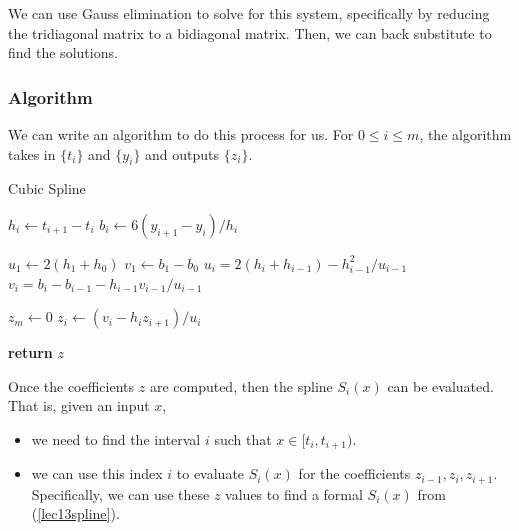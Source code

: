 \documentclass[letterpaper]{article}
\begin{document}
We can use Gauss elimination to solve for this system, specifically by reducing the tridiagonal matrix to a bidiagonal matrix. Then, we can back substitute to find the solutions. 

\subsubsection{Algorithm}
We can write an algorithm to do this process for us. For $0 \leq i \leq m$, the algorithm takes in $\{t_i\}$ and $\{y_i\}$ and outputs $\{z_i\}$. 
\begin{algorithm}[H]
    \caption{Cubic Spline}
    \begin{algorithmic}[1]
                \State $h_i \gets t_{i + 1} - t_i$ 
                \State $b_i \gets 6(y_{i + 1} - y_i) / h_i$
            \EndFor 

            \State $u_1 \gets 2(h_1 + h_0)$
            \State $v_1 \gets b_1 - b_0$
                \State $u_i = 2(h_i + h_{i - 1}) - h_{i - 1}^2 / u_{i - 1}$ 
                \State $v_i = b_i - b_{i - 1} - h_{i - 1} v_{i - 1} / u_{i - 1}$
            \EndFor 

            \State $z_m \gets 0$
                \State $z_i \gets (v_i - h_i z_{i + 1}) / u_i$ 
            \EndFor 

            \State \textbf{return} $z$
        \EndFunction 
    \end{algorithmic}
\end{algorithm}
Once the coefficients $z$ are computed, then the spline $S_i (x)$ can be evaluated. That is, given an input $x$,
\begin{itemize}
    \item we need to find the interval $i$ such that $x \in [t_i, t_{i + 1})$. 
    \item we can use this index $i$ to evaluate $S_{i}(x)$  for the coefficients $z_{i - 1}, z_i, z_{i + 1}$. Specifically, we can use these $z$ values to find a formal $S_{i}(x)$ from (\ref{lec13spline}).
\end{itemize}
\end{document}
